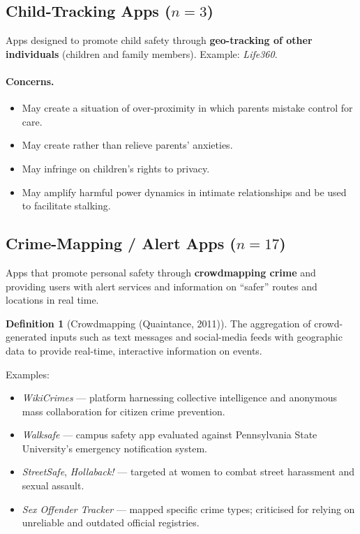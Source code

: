 \documentclass[11pt,a4paper,openany]{report}
\theoremstyle{definition}
\newtheorem{definition}{Definition}[chapter]
\theoremstyle{plain}
\theoremstyle{remark}
\begin{document}
\subsection{Child-Tracking Apps ($n = 3$)}

Apps designed to promote child safety through \textbf{geo-tracking of other individuals} (children and family members). Example: \textit{Life360}.

\paragraph{Concerns.}
\begin{itemize}
    \item May create a situation of over-proximity in which parents mistake control for care.
    \item May create rather than relieve parents' anxieties.
    \item May infringe on children's rights to privacy.
    \item May amplify harmful power dynamics in intimate relationships and be used to facilitate stalking.
\end{itemize}

\subsection{Crime-Mapping / Alert Apps ($n = 17$)}

Apps that promote personal safety through \textbf{crowdmapping crime} and providing users with alert services and information on ``safer'' routes and locations in real time.

\begin{definition}[Crowdmapping (Quaintance, 2011)]
The aggregation of crowd-generated inputs such as text messages and social-media feeds with geographic data to provide real-time, interactive information on events.
\end{definition}

Examples:
\begin{itemize}
    \item \textit{WikiCrimes} --- platform harnessing collective intelligence and anonymous mass collaboration for citizen crime prevention.
    \item \textit{Walksafe} --- campus safety app evaluated against Pennsylvania State University's emergency notification system.
    \item \textit{StreetSafe}, \textit{Hollaback!} --- targeted at women to combat street harassment and sexual assault.
    \item \textit{Sex Offender Tracker} --- mapped specific crime types; criticised for relying on unreliable and outdated official registries.
\end{itemize}
\end{document}

